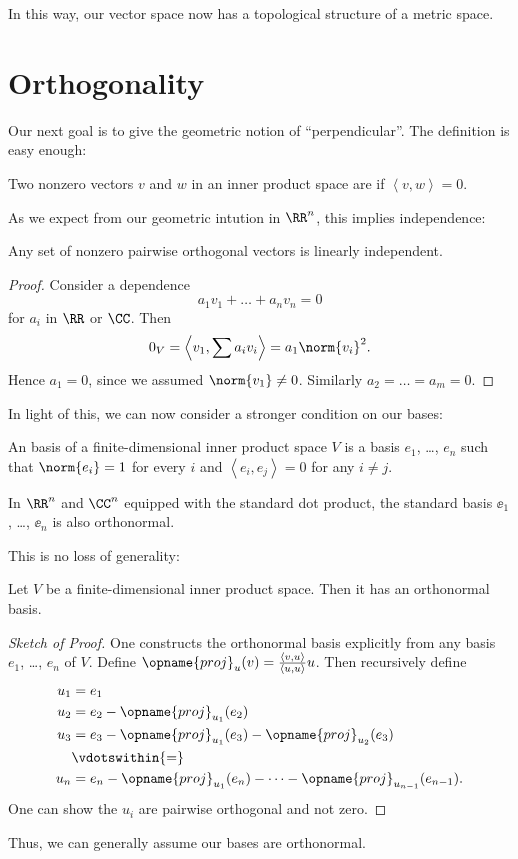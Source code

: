In this way, our vector space now has a topological structure of a metric space.

\section{Orthogonality}
Our next goal is to give the geometric notion of ``perpendicular''.
The definition is easy enough:
\begin{definition}
	Two nonzero vectors $v$ and $w$ in an inner product space
	are  if $\left< v,w \right> = 0$.
\end{definition}

As we expect from our geometric intution in $\RR^n$, this implies independence:
\begin{lemma}
	Any set of nonzero pairwise orthogonal vectors is linearly independent.
\end{lemma}
\begin{proof}
	Consider a dependence
	\[ a_1 v_1 + \dots + a_n v_n = 0 \]
	for $a_i$ in $\RR$ or $\CC$.
	Then \[ 0_V = \left< v_1, \sum a_i v_i \right> = a_1 \norm{v_i}^2. \]
	Hence $a_1 = 0$, since we assumed $\norm{v_1} \neq 0$.
	Similarly $a_2 = \dots = a_m = 0$.
\end{proof}

In light of this, we can now consider a stronger condition on our bases:
\begin{definition}
	An  basis of a finite-dimensional inner product space $V$
	is a basis $e_1$, \dots, $e_n$ such that
	$\norm{e_i} = 1$ for every $i$ and $\left< e_i, e_j \right> = 0$ for any $i \neq j$.
\end{definition}
\begin{example}
	In $\RR^n$ and $\CC^n$ equipped with the standard dot product,
	the standard basis $\ee_1$, \dots, $\ee_n$ is also orthonormal.
\end{example}
This is no loss of generality:
\begin{theorem}
	Let $V$ be a finite-dimensional inner product space.
	Then it has an orthonormal basis.
\end{theorem}
\begin{proof}[Sketch of Proof]
	One constructs the orthonormal basis explicitly from any basis
	$e_1$, \dots, $e_n$ of $V$.
	Define $\opname{proj}_u(v) = \frac{\left< v,u\right>}{\left< u,u\right>} u$.
	Then recursively define
	\begin{align*}
		u_1 &= e_1 \\
		u_2 &= e_2 - \opname{proj}_{u_1}(e_2) \\
		u_3 &= e_3 - \opname{proj}_{u_1}(e_3) - \opname{proj}_{u_2}(e_3) \\
		&\vdotswithin{=} \\
		u_n &= e_n - \opname{proj}_{u_1}(e_n) - \dots - \opname{proj}_{u_{n-1}}(e_{n-1}).
	\end{align*}
	One can show the $u_i$ are pairwise orthogonal and not zero.
\end{proof}
Thus, we can generally assume our bases are orthonormal.

